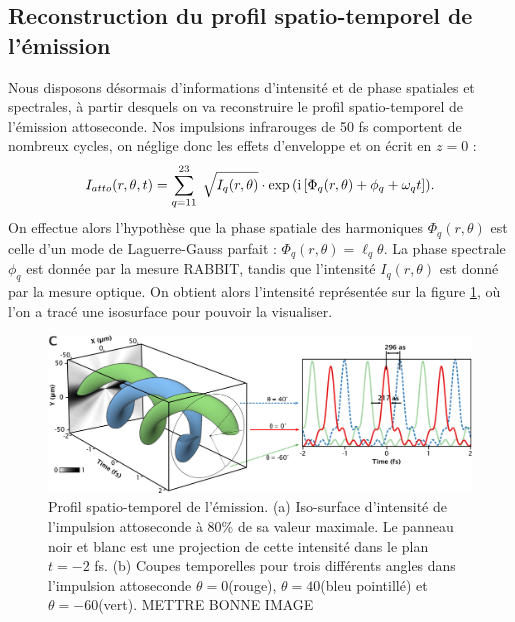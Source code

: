 \subsection{Reconstruction du profil spatio-temporel de l'émission}
Nous disposons désormais d'informations d'intensité et de phase spatiales et spectrales, à partir desquels on va reconstruire le profil spatio-temporel de l'émission attoseconde. Nos impulsions infrarouges de 50 fs comportent de nombreux cycles, on néglige donc les effets d'enveloppe et on écrit en $z = 0$ :
\begin{equation*}
I_{atto}(r,\theta,t) = \sum_{q=11}^{23}\;\sqrt{I_q(r,\theta)}\cdot\exp{(\mathrm{i}\left[\Phi_q(r,\theta)+\phi_q+\omega_q t\right])}.
\end{equation*}
On effectue alors l'hypothèse que la phase spatiale des harmoniques $\Phi_q(r,\theta)$ est celle d'un mode de Laguerre-Gauss parfait : $\Phi_q(r,\theta) = \ell_q \theta$. La phase spectrale $\phi_q$ est donnée par la mesure RABBIT, tandis que l'intensité $I_q(r,\theta)$ est donné par la mesure optique. On obtient alors l'intensité représentée sur la figure \ref{Fig:corkscrew}, où l'on a tracé une isosurface pour pouvoir la visualiser. 

\begin{figure}[!ht]
\includegraphics[width=\columnwidth]{Figures/OMABBIT/corkscrew.png}%
\caption{Profil spatio-temporel de l'émission. (a) Iso-surface d'intensité de l'impulsion attoseconde à 80\% de sa valeur maximale. Le panneau noir et blanc est une projection de cette intensité dans le plan $t=-2$ fs. (b) Coupes temporelles pour trois différents angles dans l'impulsion attoseconde $\theta=0$\degres (rouge), $\theta=40$\degres (bleu pointillé) et $\theta=-60$\degres (vert). \textcolor[rgb]{1,0,0}{METTRE BONNE IMAGE}}
\label{Fig:corkscrew}%
\end{figure}

